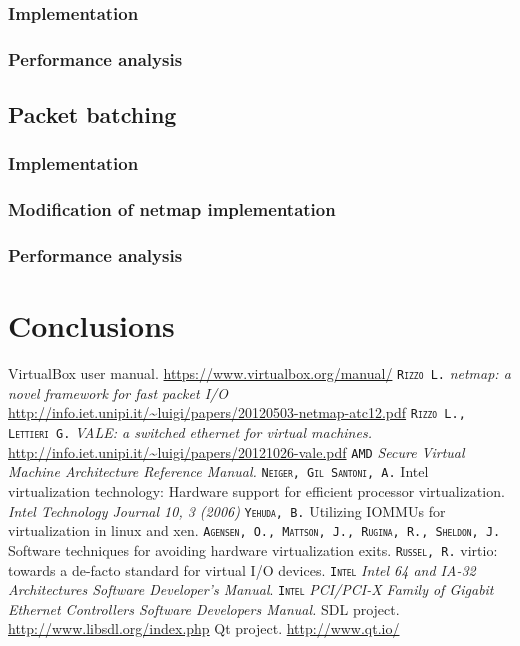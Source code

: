 \documentclass[a4paper, 12pt, titlepage]{report}
\newcommand{\autori}[1]{\textsc{\texttt{#1}}}
\begin{document}
\subsection{Implementation}
\subsection{Performance analysis}
\section{Packet batching} \label{sec:packet_batching}
\subsection{Implementation}
\subsection{Modification of netmap implementation}
\subsection{Performance analysis}
\chapter{Conclusions}

\begin{thebibliography}{30}
 VirtualBox user manual. \url{https://www.virtualbox.org/manual/}
 \autori{Rizzo L.} \textit{netmap: a novel framework for fast packet I/O} \url{http://info.iet.unipi.it/~luigi/papers/20120503-netmap-atc12.pdf}
 \autori{Rizzo L., Lettieri G.} \textit{VALE: a switched ethernet for virtual machines.} \url{http://info.iet.unipi.it/~luigi/papers/20121026-vale.pdf}
 \autori{AMD} \textit{Secure Virtual Machine Architecture Reference Manual.}
 \autori{Neiger, Gil Santoni, A.} Intel virtualization technology: Hardware support for efficient processor virtualization. \textit{Intel Technology Journal 10, 3 (2006)}
 \autori{Yehuda, B.} Utilizing IOMMUs for virtualization in linux and xen.
 \autori{Agensen, O., Mattson, J., Rugina, R., Sheldon, J.} Software techniques for avoiding hardware virtualization exits.
 \autori{Russel, R.} virtio: towards a de-facto standard for virtual I/O devices.
 \autori{Intel} \textit{Intel 64 and IA-32 Architectures Software Developer's Manual}.
 \autori{Intel} \textit{PCI/PCI-X Family of Gigabit Ethernet Controllers Software Developers Manual.}
 SDL project. \url{http://www.libsdl.org/index.php}
 Qt project. \url{http://www.qt.io/}
\end{thebibliography}
	
\end{document}
